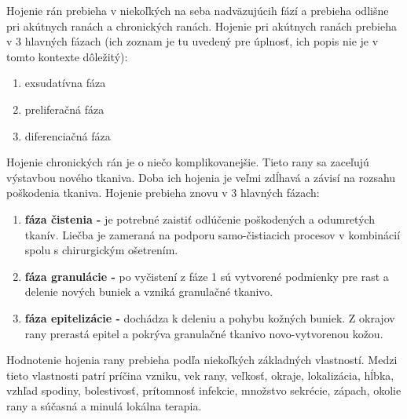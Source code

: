 Hojenie rán prebieha v niekoľkých na seba nadväzujúcih fází a prebieha odlišne pri akútnych ranách a chronických ranách. Hojenie pri akútnych ranách prebieha v 3 hlavných fázach (ich zoznam je tu uvedený pre úplnosť, ich popis nie je v tomto kontexte dôležitý):
\begin{enumerate}
\item exsudatívna fáza
\item preliferačná fáza
\item diferenciačná fáza
\end{enumerate}
Hojenie chronických rán je o niečo komplikovanejšie. Tieto rany sa zaceľujú výstavbou nového tkaniva. Doba ich hojenia je veľmi zdĺhavá a závisí na rozsahu poškodenia tkaniva. Hojenie prebieha znovu v 3 hlavných fázach:
\begin{enumerate}
\item \textbf{fáza čistenia -} je potrebné zaistiť odlúčenie poškodených a odumretých tkanív. Liečba je zameraná na podporu samo-čistiacich procesov v kombinácií spolu s chirurgickým ošetrením.
\item \textbf{fáza granulácie -} po vyčistení z fáze 1 sú vytvorené podmienky pre rast a delenie nových buniek a vzniká granulačné tkanivo.
\item \textbf{fáza epitelizácie -} dochádza k deleniu a pohybu kožných buniek. Z okrajov rany prerastá epitel a pokrýva granulačné tkanivo novo-vytvorenou kožou.
\end{enumerate}

Hodnotenie hojenia rany prebieha podľa niekoľkých základných vlastností. Medzi tieto vlastnosti patrí príčina vzniku, vek rany, veľkosť, okraje, lokalizácia, hĺbka, vzhľad spodiny, bolestivosť, prítomnosť infekcie, množstvo sekrécie, zápach, okolie rany a súčasná a minulá lokálna terapia.